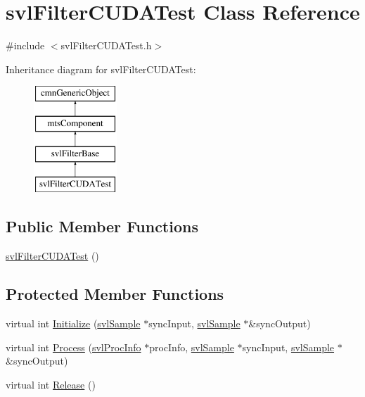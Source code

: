 \hypertarget{classsvl_filter_c_u_d_a_test}{\section{svl\-Filter\-C\-U\-D\-A\-Test Class Reference}
\label{classsvl_filter_c_u_d_a_test}
}


{\ttfamily \#include $<$svl\-Filter\-C\-U\-D\-A\-Test.\-h$>$}

Inheritance diagram for svl\-Filter\-C\-U\-D\-A\-Test\-:\begin{figure}[H]
\begin{center}
\leavevmode
\includegraphics[height=4.000000cm]{da/da7/classsvl_filter_c_u_d_a_test}
\end{center}
\end{figure}
\subsection*{Public Member Functions}
\begin{DoxyCompactItemize}
\item 
\hyperlink{classsvl_filter_c_u_d_a_test_adfe2f7dd78695560be1f5a0441392803}{svl\-Filter\-C\-U\-D\-A\-Test} ()
\end{DoxyCompactItemize}
\subsection*{Protected Member Functions}
\begin{DoxyCompactItemize}
\item 
virtual int \hyperlink{classsvl_filter_c_u_d_a_test_a7b56add38b42d1068f495e4a9439e311}{Initialize} (\hyperlink{classsvl_sample}{svl\-Sample} $\ast$sync\-Input, \hyperlink{classsvl_sample}{svl\-Sample} $\ast$\&sync\-Output)
\item 
virtual int \hyperlink{classsvl_filter_c_u_d_a_test_a23f33ea377f17aae304abee9369f75e7}{Process} (\hyperlink{structsvl_proc_info}{svl\-Proc\-Info} $\ast$proc\-Info, \hyperlink{classsvl_sample}{svl\-Sample} $\ast$sync\-Input, \hyperlink{classsvl_sample}{svl\-Sample} $\ast$\&sync\-Output)
\item 
virtual int \hyperlink{classsvl_filter_c_u_d_a_test_a1860a87c1a330c9067c9a7ead846a54f}{Release} ()
\end{DoxyCompactItemize}
